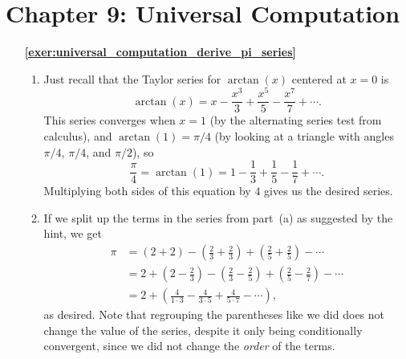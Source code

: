 \hypertarget{solutions_universal_computation}{}\label{solutions_universal_computation}
\section*{Chapter 9: Universal Computation}
\renewcommand{\chapterfolder}{universal_computation/}

\begin{multicols}{2}
	\begin{itemize}[leftmargin=0em]
		\item[\bf\color{ocre}\sffamily\ref{exer:universal_computation_derive_pi_series}] \begin{enumerate}[leftmargin=1.5em,label=\bf\color{ocre}(\alph*)]
			\item Just recall that the Taylor series for $\arctan(x)$ centered at $x = 0$ is
			\[
			\arctan(x) = x - \frac{x^3}{3} + \frac{x^5}{5} - \frac{x^7}{7} + \cdots.
			\]
			This series converges when $x = 1$ (by the alternating series test from calculus), and $\arctan(1) = \pi/4$ (by looking at a triangle with angles $\pi/4$, $\pi/4$, and $\pi/2$), so
			\[
			\frac{\pi}{4} = \arctan(1) = 1 - \frac{1}{3} + \frac{1}{5} - \frac{1}{7} + \cdots.
			\]
			Multiplying both sides of this equation by $4$ gives us the desired series.
			
			\item If we split up the terms in the series from part~(a) as suggested by the hint, we get
			\begin{align*}
				\pi & = (2 + 2) - \left(\frac{2}{3} + \frac{2}{3}\right) + \left(\frac{2}{5} + \frac{2}{5}\right) - \cdots \\
				& = 2 + \left(2 - \frac{2}{3}\right) - \left(\frac{2}{3} - \frac{2}{5}\right) + \left(\frac{2}{5} - \frac{2}{7}\right) - \cdots \\
				& = 2 + \left(\frac{4}{1\cdot 3} - \frac{4}{3\cdot 5} + \frac{4}{5\cdot 7} - \cdots\right),
			\end{align*}
			as desired. Note that regrouping the parentheses like we did does not change the value of the series, despite it only being conditionally convergent, since we did not change the \emph{order} of the terms.
			

\end{enumerate}
\end{itemize}
\end{multicols}
